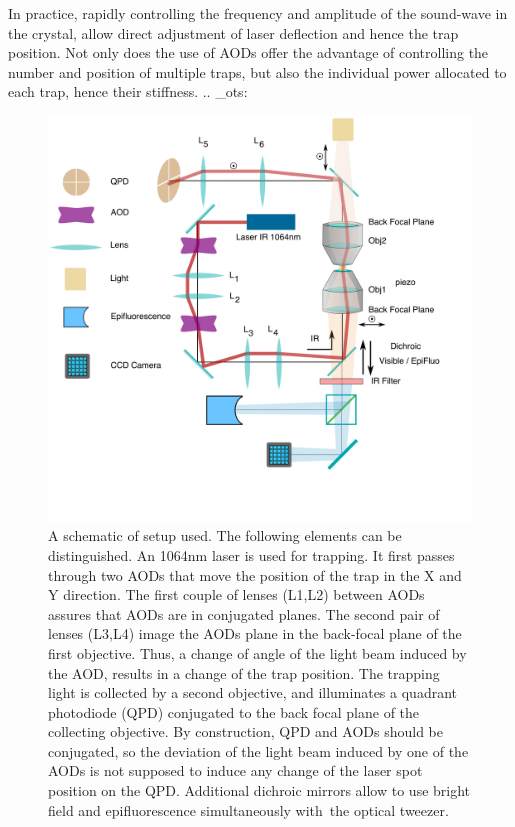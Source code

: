 \documentclass[A4paperpaper,11pt,english]{sphinxmanual}
\begin{document}
In practice, rapidly controlling the frequency and amplitude of the sound-wave
in the crystal, allow direct adjustment of laser deflection and hence the
trap position. Not only does the use of AODs offer the advantage of controlling
the number and position of multiple traps, but also the individual power allocated to each trap, hence their stiffness.
.. \_ots:
\begin{figure}[htbp]
\centering
\capstart

\includegraphics[width=0.900\linewidth]{setup-plus-1.png}
\caption{A schematic of  setup used. The following elements can be distinguished. An
1064nm laser is used for trapping. It first passes through two AODs that
move the position of the trap in the X  and Y direction.  The first couple
of lenses (L1,L2) between AODs assures that AODs are in conjugated planes.
The second pair of lenses (L3,L4) image the AODs plane in the back-focal plane
of the first objective.
Thus, a change of angle of the light beam induced by the AOD,
results in a  change of the trap position.  The trapping light
is collected by a second objective, and illuminates a quadrant photodiode
(QPD) conjugated to the back focal plane of the collecting objective. By
construction, QPD and AODs should be conjugated, so the deviation of the light
beam induced by one of the AODs is not supposed to induce any change of
the laser spot position on the QPD. Additional dichroic mirrors allow to
use bright field and epifluorescence simultaneously with the optical
tweezer.}\end{figure}
\end{document}
